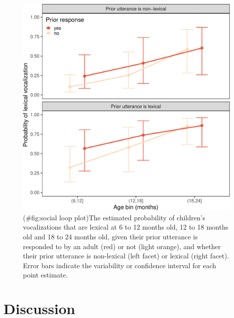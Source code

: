 \documentclass[
  man]{apa6}
\begin{document}
\begin{figure}
\centering
\includegraphics{turntaking_paper_files/figure-latex/social loop plot-1.pdf}
\caption{(\#fig:social loop plot)The estimated probability of children's vocalizations that are lexical at 6 to 12 months old, 12 to 18 months old and 18 to 24 months old, given their prior utterance is responded to by an adult (red) or not (light orange), and whether their prior utterance is non-lexical (left facet) or lexical (right facet). Error bars indicate the variability or confidence interval for each point estimate.}
\end{figure}

\hypertarget{discussion}{%
\section{Discussion}\label{discussion}}
\end{document}
